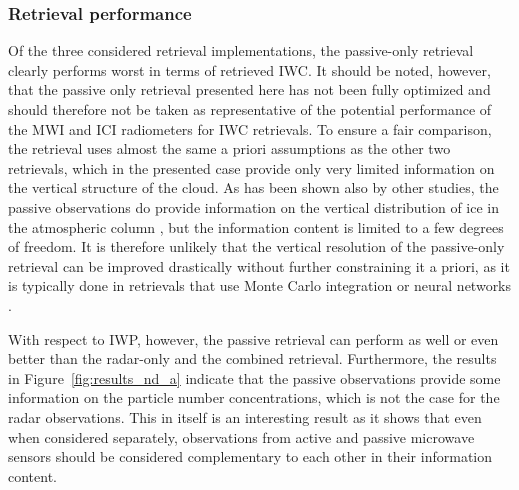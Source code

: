 \documentclass[journal abbreviation, manuscript]{copernicus}
\begin{document}
\subsubsection{Retrieval performance}

Of the three considered retrieval implementations, the passive-only retrieval
clearly performs worst in terms of retrieved IWC. It should be noted, however,
that the passive only retrieval presented here has not been fully optimized and
should therefore not be taken as representative of the potential performance of
the MWI and ICI radiometers for IWC retrievals. To ensure a fair comparison, the
retrieval uses almost the same a priori assumptions as the other two retrievals,
which in the presented case provide only very limited information on the
vertical structure of the cloud. As has been shown also by other studies, the
passive observations do provide information on the vertical distribution of ice
in the atmospheric column \citep{wang17, grutzun18}, but the information content
is limited to a few degrees of freedom. It is therefore unlikely that the
vertical resolution of the passive-only retrieval can be improved drastically
without further constraining it a priori, as it is typically done in retrievals
that use Monte Carlo integration or neural networks \citep{pfreundschuh18}.

With respect to IWP, however, the passive retrieval can perform as well or even
better than the radar-only and the combined retrieval. Furthermore, the results
in Figure~\ref{fig:results_nd_a} indicate that the passive observations provide
some information on the particle number concentrations, which is not the case
for the radar observations. This in itself is an interesting result as it shows
that even when considered separately, observations from active and passive
microwave sensors should be considered complementary to each other in their
information content.
\end{document}
